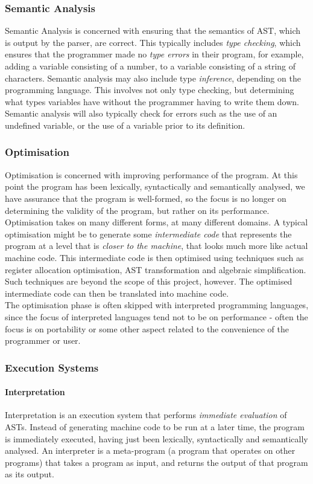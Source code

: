 \documentclass{article}
\begin{document}
\subsubsection{Semantic Analysis}
Semantic Analysis is concerned with ensuring that the semantics of AST, which is output by the parser, are correct. This typically includes \emph{type checking}, which ensures that the programmer made no \emph{type errors} in their program, for example, adding a variable consisting of a number, to a variable consisting of a string of characters. Semantic analysis may also include type \emph{inference}, depending on the programming language. This involves not only type checking, but determining what types variables have without the programmer having to write them down. Semantic analysis will also typically check for errors such as the use of an undefined variable, or the use of a variable prior to its definition.

\subsubsection{Optimisation}
Optimisation is concerned with improving performance of the program. At this point the program has been lexically, syntactically and semantically analysed, we have assurance that the program is well-formed, so the focus is no longer on determining the validity of the program, but rather on its performance. Optimisation takes on many different forms, at many different domains. A typical optimisation might be to generate some \emph{intermediate code} that represents the program at a level that is \emph{closer to the machine}, that looks much more like actual machine code. This intermediate code is then optimised using techniques such as register allocation optimisation, AST transformation and algebraic simplification. Such techniques are beyond the scope of this project, however. The optimised intermediate code can then be translated into machine code.
\\\indent The optimisation phase is often skipped with interpreted programming languages, since the focus of interpreted languages tend not to be on performance - often the focus is on portability or some other aspect related to the convenience of the programmer or user.

\subsubsection{Execution Systems}
\paragraph{Interpretation \\}
Interpretation is an execution system that performs \emph{immediate evaluation} of ASTs. Instead of generating machine code to be run at a later time, the program is immediately executed, having just been lexically, syntactically and semantically analysed. An interpreter is a meta-program (a program that operates on other programs) that takes a program as input, and returns the output of that program as its output.
\end{document}
